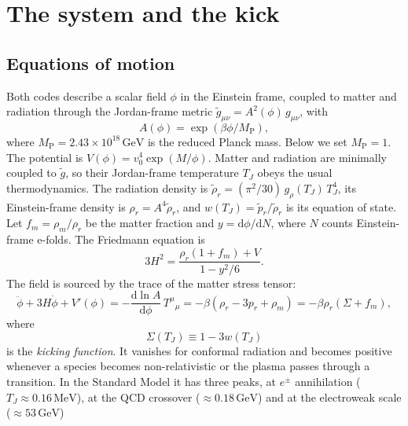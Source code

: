 \documentclass[11pt,a4paper]{article}
\newcommand{\MP}{M_{\mathrm{P}}}
\newcommand{\TJ}{T_{J}}
\newcommand{\GeV}{\,\mathrm{GeV}}
\begin{document}
\tableofcontents

\section{The system and the kick}
\label{sec:system}

\subsection{Equations of motion}

Both codes describe a scalar field $\phi$ in the Einstein frame, coupled to matter and
radiation through the Jordan-frame metric $\tilde g_{\mu\nu} = A^2(\phi)\, g_{\mu\nu}$, with
\begin{equation}
  A(\phi) = \exp(\beta\phi/\MP),
\end{equation}
where $\MP = 2.43\times10^{18}\GeV$ is the reduced Planck mass. Below we set $\MP = 1$. The
potential is $V(\phi) = v_0^4 \exp(M/\phi)$. Matter and radiation are minimally coupled to
$\tilde g$, so their Jordan-frame temperature $\TJ$ obeys the usual thermodynamics. The radiation
density is $\tilde\rho_r = (\pi^2/30)\, g_\rho(\TJ)\, \TJ^4$, its Einstein-frame density is
$\rho_r = A^4 \tilde\rho_r$, and $w(\TJ) = \tilde p_r/\tilde\rho_r$ is its equation of state.
Let $f_m = \rho_m/\rho_r$ be the matter fraction and $y = \mathrm{d}\phi/\mathrm{d}N$, where
$N$ counts Einstein-frame e-folds. The Friedmann equation is
\begin{equation}
  3H^2 = \frac{\rho_r(1+f_m) + V}{1 - y^2/6}.
  \label{eq:friedmann}
\end{equation}
The field is sourced by the trace of the matter stress tensor:
\begin{equation}
  \ddot\phi + 3H\dot\phi + V'(\phi) = -\frac{\mathrm{d}\ln A}{\mathrm{d}\phi}\, T^{\mu}{}_{\mu}
  = -\beta\left(\rho_r - 3p_r + \rho_m\right)
  = -\beta\rho_r\left(\Sigma + f_m\right),
\end{equation}
where
\begin{equation}
  \boxed{\;\Sigma(\TJ) \equiv 1 - 3w(\TJ)\;}
\end{equation}
is the \emph{kicking function}. It vanishes for conformal radiation and becomes positive
whenever a species becomes non-relativistic or the plasma passes through a transition. In the
Standard Model it has three peaks, at $e^\pm$ annihilation ($\TJ \approx 0.16\,\mathrm{MeV}$),
at the QCD crossover ($\approx 0.18\GeV$) and at the electroweak scale ($\approx 53\GeV$)
\end{document}
